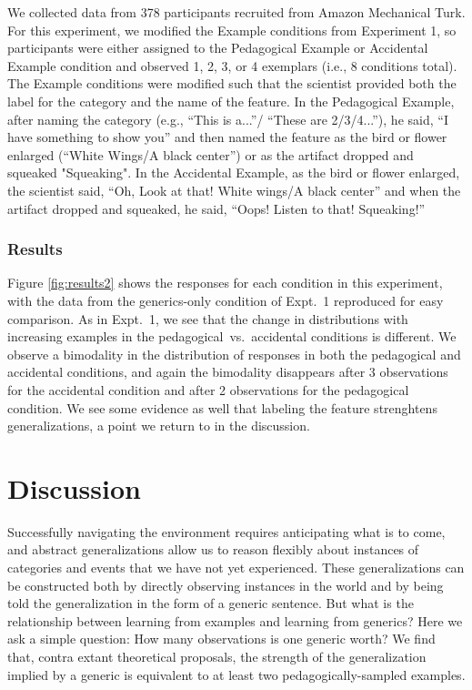 \documentclass[10pt,letterpaper]{article}
\begin{document}
We collected data from 378 participants recruited from Amazon Mechanical Turk.
For this experiment, we modified the Example conditions from Experiment 1, so participants were either assigned to the Pedagogical Example or Accidental Example condition and observed 1, 2, 3, or 4 exemplars (i.e., 8 conditions total). The Example conditions were modified such that the scientist provided both the label for the category and the name of the feature. In the Pedagogical Example, after naming the category (e.g., ``This is a...''/ ``These are 2/3/4...''), he said, ``I have something to show you'' and then named the feature as the bird or flower enlarged (``White Wings/A black center'') or as the artifact dropped and squeaked "Squeaking".
In the Accidental Example, as the bird or flower enlarged, the scientist said, ``Oh, Look at that! White wings/A black center'' and when the artifact dropped and squeaked, he said, ``Oops! Listen to that! Squeaking!'' 

\subsubsection{Results}

Figure \ref{fig:results2} shows the responses for each condition in this experiment, with the data from the generics-only condition of Expt.~1 reproduced for easy comparison. 
As in Expt.~1, we see that the change in distributions with increasing examples in the pedagogical~vs.~accidental conditions is different. We observe a bimodality in the distribution of responses in both the pedagogical and accidental conditions, and again the bimodality disappears after 3 observations for the accidental condition and after 2 observations for the pedagogical condition. We see some evidence as well that labeling the feature strenghtens generalizations, a point we return to in the discussion.

\section{Discussion}

Successfully navigating the environment requires anticipating what is to come, and abstract generalizations allow us to reason flexibly about instances of categories and events that we have not yet experienced. 
These generalizations can be constructed both by directly observing instances in the world and by being told the generalization in the form of a generic sentence. 
But what is the relationship between learning from examples and learning from generics? 
Here we ask a simple question: How many observations is one generic worth?
We find that, contra extant theoretical proposals, the strength of the generalization implied by a generic is equivalent to at least two pedagogically-sampled examples. 
\end{document}
